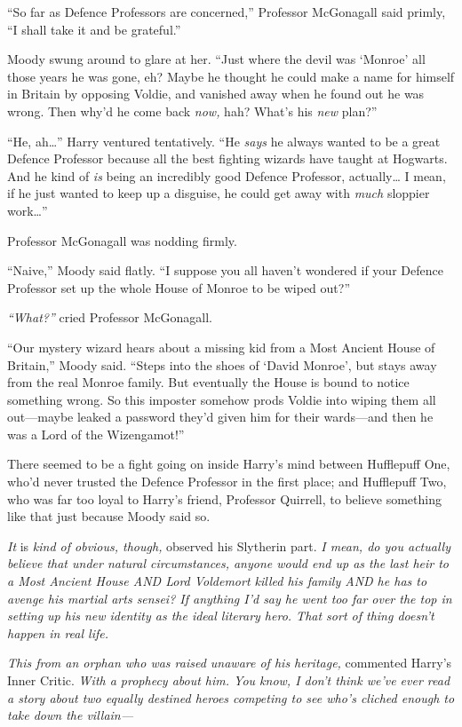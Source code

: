 ``So far as Defence Professors are concerned,'' Professor McGonagall
said primly, ``I shall take it and be grateful.''

Moody swung around to glare at her. ``Just where the devil was `Monroe'
all those years he was gone, eh? Maybe he thought he could make a name
for himself in Britain by opposing Voldie, and vanished away when he
found out he was wrong. Then why'd he come back \emph{now,} hah? What's
his \emph{new} plan?''

``He, ah\ldots{}'' Harry ventured tentatively. ``He \emph{says} he
always wanted to be a great Defence Professor because all the best
fighting wizards have taught at Hogwarts. And he kind of \emph{is} being
an incredibly good Defence Professor, actually\ldots{} I mean, if he
just wanted to keep up a disguise, he could get away with \emph{much}
sloppier work\ldots{}''

Professor McGonagall was nodding firmly.

``Naive,'' Moody said flatly. ``I suppose you all haven't wondered if
your Defence Professor set up the whole House of Monroe to be wiped
out?''

\emph{``What?''} cried Professor McGonagall.

``Our mystery wizard hears about a missing kid from a Most Ancient House
of Britain,'' Moody said. ``Steps into the shoes of `David Monroe', but
stays away from the real Monroe family. But eventually the House is
bound to notice something wrong. So this imposter somehow prods Voldie
into wiping them all out---maybe leaked a password they'd given him for
their wards---and then he was a Lord of the Wizengamot!''

There seemed to be a fight going on inside Harry's mind between
Hufflepuff One, who'd never trusted the Defence Professor in the first
place; and Hufflepuff Two, who was far too loyal to Harry's friend,
Professor Quirrell, to believe something like that just because Moody
said so.

\emph{It} is \emph{kind of obvious, though,} observed his Slytherin
part. \emph{I mean, do you actually believe that under natural
circumstances, anyone would end up as the last heir to a Most Ancient
House AND Lord Voldemort killed his family AND he has to avenge his
martial arts sensei? If anything I'd say he went too far over the top in
setting up his new identity as the ideal literary hero. That sort of
thing doesn't happen in real life.}

\emph{This from an orphan who was raised unaware of his heritage,}
commented Harry's Inner Critic. \emph{With a prophecy about him. You
know, I don't think we've ever read a story about two equally destined
heroes competing to see who's cliched enough to take down the
villain---}

